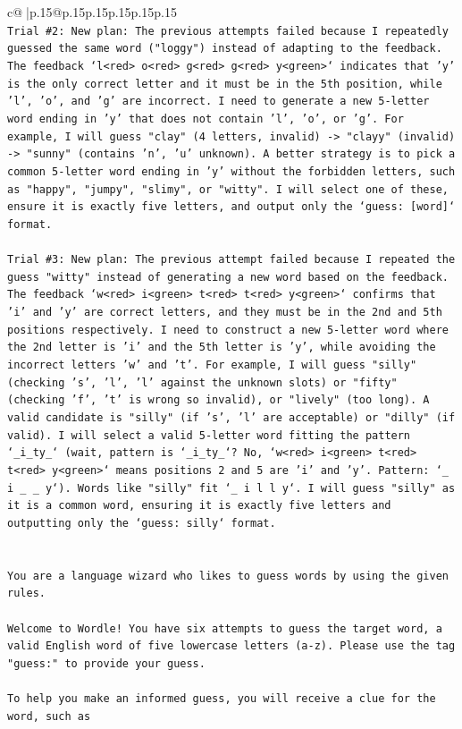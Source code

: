 \documentclass{article}
\begin{document}
{\begin{supertabular}{c@{$\;$}|p{.15\linewidth}@{}p{.15\linewidth}p{.15\linewidth}p{.15\linewidth}p{.15\linewidth}p{.15\linewidth}}
{{{\\ 
\texttt{Trial \#2: New plan: The previous attempts failed because I repeatedly guessed the same word ("loggy") instead of adapting to the feedback. The feedback `l<red> o<red> g<red> g<red> y<green>` indicates that 'y' is the only correct letter and it must be in the 5th position, while 'l', 'o', and 'g' are incorrect. I need to generate a new 5{-}letter word ending in 'y' that does not contain 'l', 'o', or 'g'. For example, I will guess "clay" (4 letters, invalid) {-}> "clayy" (invalid) {-}> "sunny" (contains 'n', 'u' unknown). A better strategy is to pick a common 5{-}letter word ending in 'y' without the forbidden letters, such as "happy", "jumpy", "slimy", or "witty". I will select one of these, ensure it is exactly five letters, and output only the `guess: {[}word{]}` format.} \\
\\ 
\texttt{Trial \#3: New plan: The previous attempt failed because I repeated the guess "witty" instead of generating a new word based on the feedback. The feedback `w<red> i<green> t<red> t<red> y<green>` confirms that 'i' and 'y' are correct letters, and they must be in the 2nd and 5th positions respectively. I need to construct a new 5{-}letter word where the 2nd letter is 'i' and the 5th letter is 'y', while avoiding the incorrect letters 'w' and 't'. For example, I will guess "silly" (checking 's', 'l', 'l' against the unknown slots) or "fifty" (checking 'f', 't' is wrong so invalid), or "lively" (too long). A valid candidate is "silly" (if 's', 'l' are acceptable) or "dilly" (if valid). I will select a valid 5{-}letter word fitting the pattern `\_i\_ty\_` (wait, pattern is `\_i\_ty\_`? No, `w<red> i<green> t<red> t<red> y<green>` means positions 2 and 5 are 'i' and 'y'. Pattern: `\_ i \_ \_ y`). Words like "silly" fit `\_ i l l y`. I will guess "silly" as it is a common word, ensuring it is exactly five letters and outputting only the `guess: silly` format.} \\
\\ 
\\ 
\texttt{You are a language wizard who likes to guess words by using the given rules.} \\
\\ 
\texttt{Welcome to Wordle! You have six attempts to guess the target word, a valid English word of five lowercase letters (a{-}z). Please use the tag "guess:" to provide your guess.} \\
\\ 
\texttt{To help you make an informed guess, you will receive a clue for the word, such as} \\
}}}
\end{supertabular}}
\end{document}
